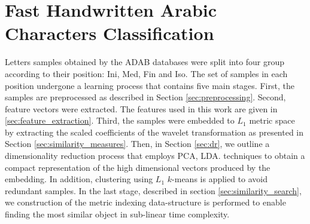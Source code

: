 %
%
%
%
%
%

\chapter{Fast Handwritten Arabic Characters Classification}
\label{chap:characters_classification}

\iftoggle{edit-mode}{\hspace{0pt}\marginpar{The learning process}}{}
Letters samples obtained by the ADAB databases were split into four group according to their position: Ini, Med, Fin and Iso. 
The set of samples in each position undergone a learning process that contains five main stages.
First, the samples are preprocessed as described in Section \ref{sec:preprocessing}.
Second, feature vectors were extracted.
The features used in this work are given in \ref{sec:feature_extraction}.
Third, the samples were embedded to $L_1$ metric space by extracting the scaled coefficients of the wavelet transformation as presented in Section \ref{sec:similarity_measures}. 
Then, in Section \ref{sec:dr}, we outline a dimensionality reduction process that employs PCA, LDA. techniques to obtain a compact representation of the high dimensional vectors produced by the embedding.
In addition, clustering using $L_1$ $k$-means is applied to avoid redundant samples. 
In the last stage, described in section \ref{sec:similarity_search}, we construction of the metric indexing data-structure is performed to enable finding the most similar object in sub-linear time complexity.

